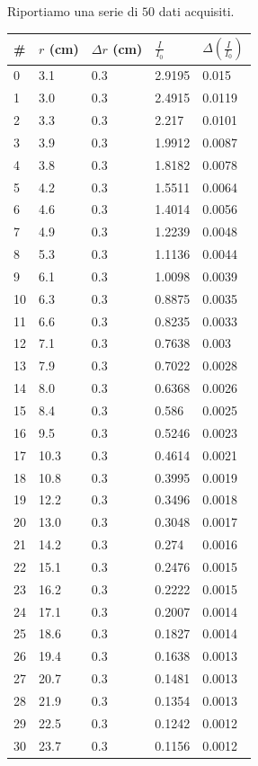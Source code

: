\documentclass[11pt]{article}
\begin{document}
    Riportiamo una serie di $50$ dati acquisiti.

    \begin{tabularx}{\textwidth}{XXXXX}
\toprule
\# & \(r\) (cm) & \(\Delta r\) (cm) & \(\frac{I}{I_0}\) &
\(\Delta\left(\frac{I}{I_0}\right)\)\\
\midrule
\endhead
0 & 3.1 & 0.3 & 2.9195 & 0.015\\
1 & 3.0 & 0.3 & 2.4915 & 0.0119\\
2 & 3.3 & 0.3 & 2.217 & 0.0101\\
3 & 3.9 & 0.3 & 1.9912 & 0.0087\\
4 & 3.8 & 0.3 & 1.8182 & 0.0078\\
5 & 4.2 & 0.3 & 1.5511 & 0.0064\\
6 & 4.6 & 0.3 & 1.4014 & 0.0056\\
7 & 4.9 & 0.3 & 1.2239 & 0.0048\\
8 & 5.3 & 0.3 & 1.1136 & 0.0044\\
9 & 6.1 & 0.3 & 1.0098 & 0.0039\\
10 & 6.3 & 0.3 & 0.8875 & 0.0035\\
11 & 6.6 & 0.3 & 0.8235 & 0.0033\\
12 & 7.1 & 0.3 & 0.7638 & 0.003\\
13 & 7.9 & 0.3 & 0.7022 & 0.0028\\
14 & 8.0 & 0.3 & 0.6368 & 0.0026\\
15 & 8.4 & 0.3 & 0.586 & 0.0025\\
16 & 9.5 & 0.3 & 0.5246 & 0.0023\\
17 & 10.3 & 0.3 & 0.4614 & 0.0021\\
18 & 10.8 & 0.3 & 0.3995 & 0.0019\\
19 & 12.2 & 0.3 & 0.3496 & 0.0018\\
20 & 13.0 & 0.3 & 0.3048 & 0.0017\\
21 & 14.2 & 0.3 & 0.274 & 0.0016\\
22 & 15.1 & 0.3 & 0.2476 & 0.0015\\
23 & 16.2 & 0.3 & 0.2222 & 0.0015\\
24 & 17.1 & 0.3 & 0.2007 & 0.0014\\
25 & 18.6 & 0.3 & 0.1827 & 0.0014\\
26 & 19.4 & 0.3 & 0.1638 & 0.0013\\
27 & 20.7 & 0.3 & 0.1481 & 0.0013\\
28 & 21.9 & 0.3 & 0.1354 & 0.0013\\
29 & 22.5 & 0.3 & 0.1242 & 0.0012\\
30 & 23.7 & 0.3 & 0.1156 & 0.0012\\

\end{tabularx}
\end{document}
